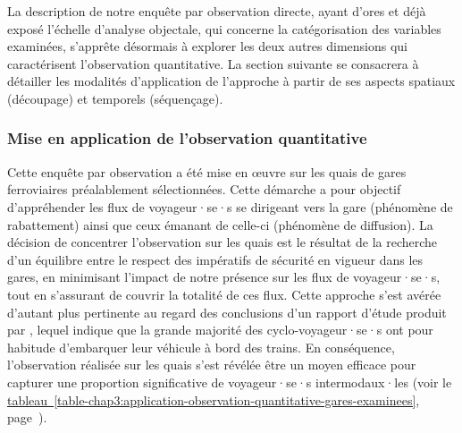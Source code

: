 \begin{refsegment}
La description de notre enquête par observation directe, ayant d'ores et déjà exposé l'échelle d'analyse objectale, qui concerne la catégorisation des variables examinées, s'apprête désormais à explorer les deux autres dimensions qui caractérisent l'observation quantitative. La section suivante se consacrera à détailler les modalités d'application de l'approche à partir de ses aspects spatiaux (découpage) et temporels (séquençage).%

\subsubsection*{Mise en application de l'observation quantitative
    \label{chap3:application-observation-quantitative}
    }

Cette enquête par observation a été mise en œuvre sur les quais de gares ferroviaires préalablement sélectionnées. Cette démarche a pour objectif d'appréhender les flux de voyageur·se·s se dirigeant vers la gare (phénomène de rabattement) ainsi que ceux émanant de celle-ci (phénomène de diffusion). La décision de concentrer l'observation sur les quais est le résultat de la recherche d'un équilibre entre le respect des impératifs de sécurité en vigueur dans les gares, en minimisant l'impact de notre présence sur les flux de voyageur·se·s, tout en s'assurant de couvrir la totalité de ces flux. Cette approche s'est avérée d'autant plus pertinente au regard des conclusions d'un rapport d'étude produit par \textcolor{blue}{\textcite[13]{enov_enquete_2021}}, lequel indique que la grande majorité des cyclo-voyageur·se·s ont pour habitude d'embarquer leur véhicule à bord des trains. En conséquence, l'observation réalisée sur les quais s'est révélée être un moyen efficace pour capturer une proportion significative de voyageur·se·s intermodaux·les (voir le \hyperref[table-chap3:application-observation-quantitative-gares-examinees]{tableau~\ref{table-chap3:application-observation-quantitative-gares-examinees}}, page~\pageref{table-chap3:application-observation-quantitative-gares-examinees}).%



\end{refsegment}
